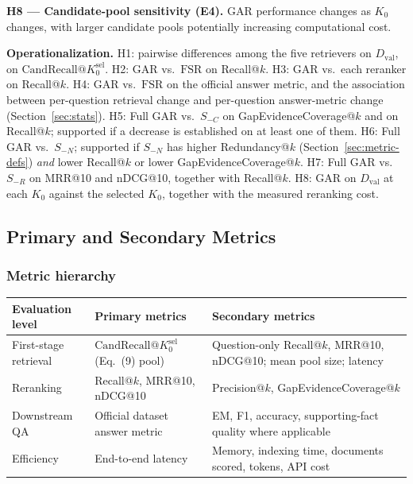 \documentclass[11pt,a4paper]{article}
\begin{document}
\textbf{H8 --- Candidate-pool sensitivity (E4).} GAR performance changes as $K_0$ changes, with larger candidate pools potentially increasing computational cost.

\textbf{Operationalization.} H1: pairwise differences among the five retrievers on $D_{\mathrm{val}}$, on $\mathrm{CandRecall}@K_0^{\mathrm{sel}}$. H2: GAR vs.\ $\mathrm{FSR}$ on Recall@$k$. H3: GAR vs.\ each reranker on Recall@$k$. H4: GAR vs.\ $\mathrm{FSR}$ on the official answer metric, and the association between per-question retrieval change and per-question answer-metric change (Section~\ref{sec:stats}). H5: Full GAR vs.\ $S_{-C}$ on GapEvidenceCoverage@$k$ and on Recall@$k$; supported if a decrease is established on at least one of them. H6: Full GAR vs.\ $S_{-N}$; supported if $S_{-N}$ has higher Redundancy@$k$ (Section~\ref{sec:metric-defs}) \emph{and} lower Recall@$k$ or lower GapEvidenceCoverage@$k$. H7: Full GAR vs.\ $S_{-R}$ on MRR@10 and nDCG@10, together with Recall@$k$. H8: GAR on $D_{\mathrm{val}}$ at each $K_0$ against the selected $K_0$, together with the measured reranking cost.

\subsection{Primary and Secondary Metrics}
\label{sec:metrics}

\subsubsection{Metric hierarchy}

\begin{center}
\small
\begin{tabularx}{\textwidth}{>{\raggedright\arraybackslash}p{3.0cm}>{\raggedright\arraybackslash}X>{\raggedright\arraybackslash}X}
\toprule
\textbf{Evaluation level} & \textbf{Primary metrics} & \textbf{Secondary metrics}\\
\midrule
First-stage retrieval & $\mathrm{CandRecall}@K_0^{\mathrm{sel}}$ (Eq.~(9) pool) & Question-only Recall@$k$, MRR@10, nDCG@10; mean pool size; latency\\
Reranking & Recall@$k$, MRR@10, nDCG@10 & Precision@$k$, GapEvidenceCoverage@$k$\\
Downstream QA & Official dataset answer metric & EM, F1, accuracy, supporting-fact quality where applicable\\
Efficiency & End-to-end latency & Memory, indexing time, documents scored, tokens, API cost\\
\bottomrule
\end{tabularx}
\end{center}
\end{document}
